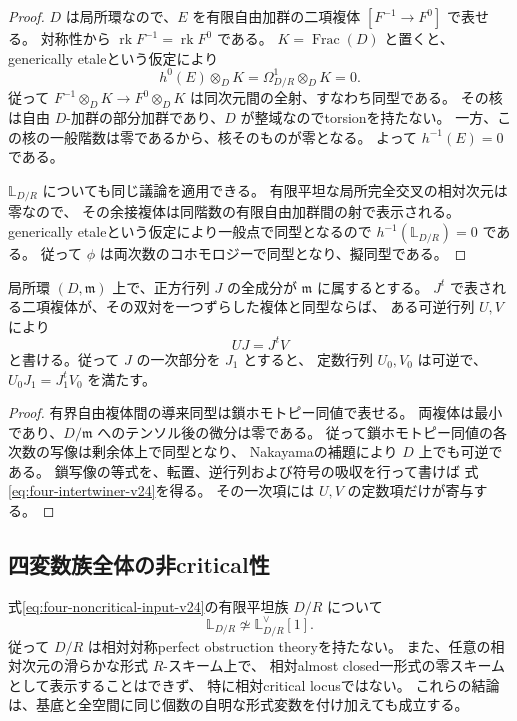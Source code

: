 \begin{proof}
$D$ は局所環なので、$E$ を有限自由加群の二項複体
$[F^{-1}\to F^0]$ で表せる。
対称性から $\operatorname{rk}F^{-1}=\operatorname{rk}F^0$ である。
$K=\operatorname{Frac}(D)$ と置くと、generically etaleという仮定により
\[
 h^0(E)\otimes_DK=\Omega^1_{D/R}\otimes_DK=0.
\]
従って $F^{-1}\otimes_DK\to F^0\otimes_DK$ は同次元間の全射、すなわち同型である。
その核は自由 $D$-加群の部分加群であり、$D$ が整域なのでtorsionを持たない。
一方、この核の一般階数は零であるから、核そのものが零となる。
よって $h^{-1}(E)=0$ である。

$\mathbb L_{D/R}$ についても同じ議論を適用できる。
有限平坦な局所完全交叉の相対次元は零なので、
その余接複体は同階数の有限自由加群間の射で表示される。
generically etaleという仮定により一般点で同型となるので
$h^{-1}(\mathbb L_{D/R})=0$ である。
従って $\phi$ は両次数のコホモロジーで同型となり、擬同型である。
\end{proof}

\begin{lemma}[最小二項複体の一次障害]\label{lem:minimal-intertwiner-v24}
局所環 $(D,\mathfrak m)$ 上で、正方行列 $J$ の全成分が $\mathfrak m$ に属するとする。
$J^t$ で表される二項複体が、その双対を一つずらした複体と同型ならば、
ある可逆行列 $U,V$ により
\begin{equation}\label{eq:four-intertwiner-v24}
 UJ=J^tV
\end{equation}
と書ける。従って $J$ の一次部分を $J_1$ とすると、
定数行列 $U_0,V_0$ は可逆で、$U_0J_1=J_1^tV_0$ を満たす。
\end{lemma}

\begin{proof}
有界自由複体間の導来同型は鎖ホモトピー同値で表せる。
両複体は最小であり、$D/\mathfrak m$ へのテンソル後の微分は零である。
従って鎖ホモトピー同値の各次数の写像は剰余体上で同型となり、
Nakayamaの補題により $D$ 上でも可逆である。
鎖写像の等式を、転置、逆行列および符号の吸収を行って書けば
式\eqref{eq:four-intertwiner-v24}を得る。
その一次項には $U,V$ の定数項だけが寄与する。
\end{proof}

\subsection{四変数族全体の非critical性}

\begin{theorem}\label{thm:four-noncritical-v24}
式\eqref{eq:four-noncritical-input-v24}の有限平坦族 $D/R$ について
\[
 \mathbb L_{D/R}\not\simeq\mathbb L_{D/R}^\vee[1].
\]
従って $D/R$ は相対対称perfect obstruction theoryを持たない。
また、任意の相対次元の滑らかな形式 $R$-スキーム上で、
相対almost closed一形式の零スキームとして表示することはできず、
特に相対critical locusではない。
これらの結論は、基底と全空間に同じ個数の自明な形式変数を付け加えても成立する。
\end{theorem}

